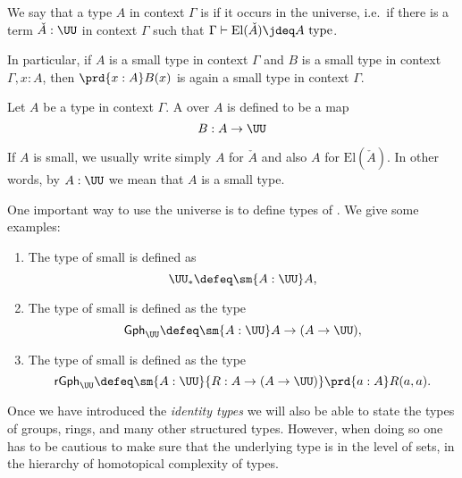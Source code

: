 \begin{defn}
We say that a type $A$ in context $\Gamma$ is  if it occurs in the universe, i.e.~if there is a term $\check{A}:\UU$ in context $\Gamma$ such that $\Gamma\vdash\mathrm{El}(\check{A})\jdeq A~\mathrm{type}$.
\end{defn}

In particular, if $A$ is a small type in context $\Gamma$ and $B$ is a small type in context $\Gamma,x:A$, then $\prd{x:A}B(x)$ is again a small type in context $\Gamma$.

\begin{defn}
Let $A$ be a type in context $\Gamma$. A  over $A$ is defined to be a map
\begin{equation*}
B:A\to\UU
\end{equation*}
\end{defn}

\begin{rmk}
If $A$ is small, we usually write simply $A$ for $\check{A}$ and also $A$ for $\mathrm{El}(\check{A})$. In other words, by $A:\UU$ we mean that $A$ is a small type. 
\end{rmk}

\begin{eg}
One important way to use the universe is to define types of . We give some examples:
\begin{enumerate}
\item The type of small  is defined as
\begin{equation*}
\UU_\ast\defeq \sm{A:\UU}A,
\end{equation*}
\item The type of small  is defined as the type
\begin{equation*}
\mathsf{Gph}_\UU \defeq \sm{A:\UU} A\to (A\to \UU),
\end{equation*}
\item The type of small  is defined as the type
\begin{equation*}
\mathsf{rGph}_\UU \defeq \sm{A:\UU}{R:A\to (A\to \UU)}\prd{a:A}R(a,a).
\end{equation*}
\end{enumerate}
Once we have introduced the \emph{identity types} we will also be able to state the types of groups, rings, and many other structured types. However, when doing so one has to be cautious to make sure that the underlying type is in the level of sets, in the hierarchy of homotopical complexity of types.
\end{eg}


